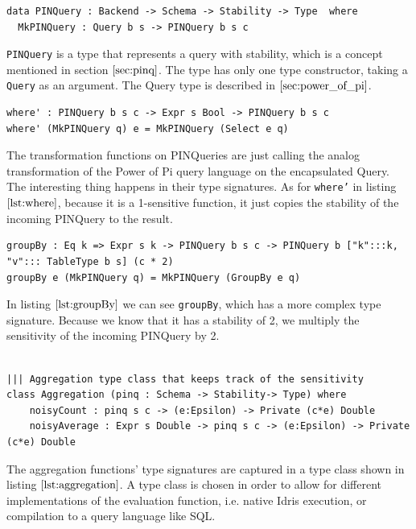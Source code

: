 \documentclass[12pt]{article}
\begin{document}
\begin{lstlisting}[label={lst:pinquery},caption=PINQuery - wrapper around Query]
data PINQuery : Backend -> Schema -> Stability -> Type  where
  MkPINQuery : Query b s -> PINQuery b s c
\end{lstlisting}

\texttt{PINQuery} is a type that represents a query with stability, which is a concept mentioned in section $\ref{sec:pinq}$. 
The type has only one type constructor, taking a \texttt{Query} as an argument. The Query type is described in $\ref{sec:power_of_pi}$.

\begin{lstlisting}[label={lst:where},caption=Selection on PINQuery]
where' : PINQuery b s c -> Expr s Bool -> PINQuery b s c
where' (MkPINQuery q) e = MkPINQuery (Select e q)
\end{lstlisting}

The transformation functions on PINQueries are just calling the analog transformation of the Power of Pi query language on the encapsulated Query.
The interesting thing happens in their type signatures. 
As for \texttt{where'} in listing $\ref{lst:where}$, because it is a 1-sensitive function, it just copies the stability of the incoming PINQuery to the result.


\begin{lstlisting}[label={lst:groupBy},caption=groupBy]
groupBy : Eq k => Expr s k -> PINQuery b s c -> PINQuery b ["k":::k, "v"::: TableType b s] (c * 2)
groupBy e (MkPINQuery q) = MkPINQuery (GroupBy e q)
\end{lstlisting}

In listing $\ref{lst:groupBy}$ we can see \texttt{groupBy}, which has a more complex type signature.
Because we know that it has a stability of 2, we multiply the sensitivity of the incoming PINQuery by 2.

\begin{lstlisting}[label={lst:aggregation},caption=Aggregation type class]

||| Aggregation type class that keeps track of the sensitivity
class Aggregation (pinq : Schema -> Stability-> Type) where
    noisyCount : pinq s c -> (e:Epsilon) -> Private (c*e) Double
    noisyAverage : Expr s Double -> pinq s c -> (e:Epsilon) -> Private (c*e) Double
\end{lstlisting}

The aggregation functions' type signatures are captured in a type class shown in listing $\ref{lst:aggregation}$.
A type class is chosen in order to allow for different implementations of the evaluation function, i.e. native Idris execution, or compilation to a query language like SQL.
\end{document}
